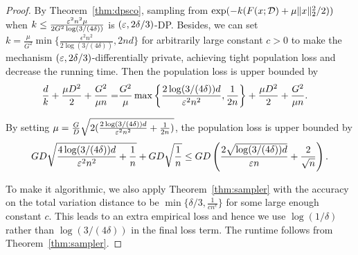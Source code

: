 \begin{proof}
By Theorem~\ref{thm:dpsco}, sampling from $\exp(-k(F(x;\mathcal D)+\mu \|x\|_2^2/2))$ when $k\leq \frac{\varepsilon^2n^2\mu}{2G^2\log(3/(4\delta))}$ is $(\varepsilon,2\delta/3)$-DP.
Besides, 
we can set  $k=\frac{\mu}{G^2}\min\{\frac{\epsilon^{2}n^{2}}{2\log(3/(4\delta))},2nd\}$ for arbitrarily large constant $c>0$ to make the mechanism $(\varepsilon,2\delta/3)$-differentially private, achieving tight population loss and decrease the running time.
Then the population loss is upper bounded by
\begin{align*}
    \frac{d}{k}+\frac{\mu D^2}{2}+\frac{G^2}{\mu n}=& \frac{G^2}{\mu}\max\left\{\frac{2\log(3/(4\delta))d}{\varepsilon^2n^2},\frac{1}{2n}\right\}+\frac{\mu D^2}{2}+\frac{G^2}{\mu n}.
\end{align*}

By setting $\mu=\frac{G}{D}\sqrt{2(\frac{2\log(3/(4\delta))d}{\varepsilon^2 n^2}+\frac{1}{2n})}$, the population loss is upper bounded by
\begin{align*}
    GD\sqrt{\frac{4\log(3/(4\delta))d}{\varepsilon^2 n^2}+\frac{1}{n}}+GD\sqrt{\frac{1}{n}}\leq GD\left(\frac{2\sqrt{\log(3/(4\delta))d}}{\varepsilon n}+\frac{2}{\sqrt{n}}\right).
\end{align*}

To make it algorithmic, we also apply Theorem~\ref{thm:sampler} with the accuracy on the total variation distance to be $\min\{\delta/3,\frac{1}{cn^c}\}$ for some large enough constant $c$. This leads to an extra empirical loss and hence we use $\log(1/\delta)$ rather than $\log(3/(4\delta))$ in the final loss term. The runtime follows from Theorem~\ref{thm:sampler}.
\end{proof}

\begin{comment}
\begin{remark}
An alternative way to achieve $O(nd)$ first order oracle (query sub-gradient) complexity is to run proximal point algorithm on non-smooth functions, which can be shown with similar contractility as running stochastic gradient descent on smooth functions. Thus replacing the SGD in \cite{FKT20} by proximal point algorithm, we can achieve $\Tilde{O}(nd)$ gradient queries for DP-SCO. But this method takes gradient queries while we query values, and it requires more memory space $\Omega(d^2)$ compared to our algorithm.
\end{remark}

\end{comment}
